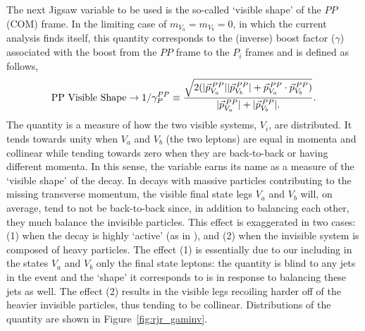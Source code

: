 The next Jigsaw variable to be used is the so-called `visible shape' of the $PP$ (COM) frame.
In the limiting case of $m_{V_a} = m_{V_b} = 0$, in which the current analysis finds itself,
this quantity corresponds to the (inverse) boost factor ($\gamma$) associated with the boost from the
$PP$ frame to the $P_i$ frames and is defined as follows,
\begin{align}
    \text{PP Visible Shape} \rightarrow 1/\gamma_P^{PP} \equiv \frac{
        \sqrt{
            2(|\vec{p}_{V_a}^{\,PP}| |\vec{p}_{V_b}^{\,PP}| + \vec{p}_{V_a}^{\,PP} \cdot \vec{p}_{V_b}^{\,PP})
        }
    }
    {
        |\vec{p}_{V_a}^{\,PP}| + |\vec{p}_{V_b}^{\,PP}|.
    }.
    \label{eq:rjr_gaminv}
\end{align}
The quantity \gaminv is a measure of how the two visible systems, $V_i$, are distributed.
It tends towards unity when $V_a$ and $V_b$ (the two leptons) are equal in momenta and collinear while tending
towards zero when they are back-to-back or having different momenta.
In this sense, the variable earns its name as a measure of the `visible shape' of the decay.
In decays with massive particles contributing to the missing transverse momentum,
the visible final state legs $V_a$ and $V_b$ will, on average, tend to not be back-to-back since,
in addition to balancing each other, they much balance the invisible particles.
This effect is exaggerated in two cases: (1) when the decay is highly `active' (as in \ttbar),
and (2) when the invisible system is composed of heavy particles.
The effect (1) is essentially due to our including in the states $V_a$ and $V_b$ only the
final state leptons: the quantity \gaminv is blind to any jets in the event and the `shape' it
corresponds to is in response to balancing these jets as well.
The effect (2) results in the visible legs recoiling harder off of the heavier invisible particles,
thus tending to be collinear.
Distributions of the \gaminv quantity are shown in Figure~\ref{fig:rjr_gaminv}.

